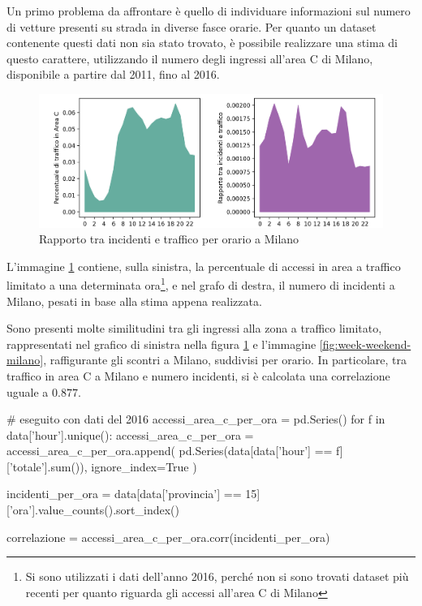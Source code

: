 \documentclass[a4paper,12pt]{report}
\begin{document}
Un primo problema da affrontare è quello di individuare informazioni sul 
numero di vetture presenti su strada in diverse fasce orarie. 
Per quanto un dataset contenente questi dati non sia stato trovato, 
è possibile realizzare una stima di questo carattere, 
utilizzando il numero degli ingressi all'area C di Milano, 
disponibile a partire dal 2011, fino al 2016. 

\begin{figure}
    \includegraphics[width=\linewidth]{../src/area_c/rapporto_orario.png}
    \caption{Rapporto tra incidenti e traffico per orario a Milano}
    \label{fig:rapporto-incidenti-traffico}
\end{figure}

L'immagine \ref{fig:rapporto-incidenti-traffico} contiene, sulla sinistra, 
la percentuale di accessi in area a traffico limitato a una determinata 
ora\footnote{Si sono utilizzati i dati dell'anno 2016, perché non si sono trovati 
dataset più recenti per quanto riguarda gli accessi all'area C di Milano}, 
e nel grafo di destra, il numero di incidenti a Milano, pesati in base alla 
stima appena realizzata. 

Sono presenti molte similitudini tra gli ingressi alla zona a traffico limitato, 
rappresentati nel grafico di sinistra nella 
figura \ref{fig:rapporto-incidenti-traffico} e l'immagine \ref{fig:week-weekend-milano}, 
raffigurante gli scontri a Milano, suddivisi per orario. 
In particolare, tra traffico in area C a Milano e 
numero incidenti, si è calcolata una correlazione uguale a $0.877$. 

\begin{code}
# eseguito con dati del 2016
accessi_area_c_per_ora = pd.Series()
for f in data['hour'].unique():
    accessi_area_c_per_ora = accessi_area_c_per_ora.append(
        pd.Series(data[data['hour'] == f]['totale'].sum()), 
        ignore_index=True
        )

incidenti_per_ora = data[data['provincia'] == 15]['ora'].value_counts().sort_index()

correlazione = accessi_area_c_per_ora.corr(incidenti_per_ora)
\end{code}
\end{document}
